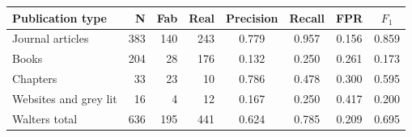\begin{tabular}{lrrrcccc}
\toprule
Publication type                          & N & Fab & Real & Precision & Recall & FPR & $F_1$ \\
\midrule
Journal articles                        & 383 & 140 & 243 & 0.779 & 0.957 & 0.156 & 0.859 \\
Books                                   & 204 & 28 & 176 & 0.132 & 0.250 & 0.261 & 0.173 \\
Chapters                                & 33 & 23 & 10 & 0.786 & 0.478 & 0.300 & 0.595 \\
Websites and grey lit                   & 16 & 4 & 12 & 0.167 & 0.250 & 0.417 & 0.200 \\
\midrule
Walters total                              & 636 & 195 & 441 & 0.624 & 0.785 & 0.209 & 0.695 \\
\bottomrule
\end{tabular}

